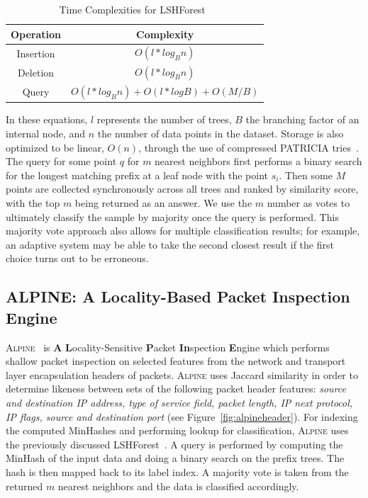 \begin{table} [ht!]
\caption{Time Complexities for LSHForest~\cite{lshforest}}
\centering
\begin{tabular}{|c | c |}
\hline
\textbf{Operation} & \textbf{Complexity} \\
\hline
Insertion & $O(l * log_B n)$ \\
\hline
Deletion & $O(l * log_B n)$ \\
\hline
Query &  $O(l * log_B n) + O(l * log B) + O(M/B)$\\
\hline
\end{tabular}
\label{table:forestcomplex}
\end{table}

In these equations, $l$ represents the number of trees, $B$ the branching factor of an internal node, and $n$ the number of data points in the dataset. Storage is also optimized to be linear, $O(n)$, through the use of compressed PATRICIA tries~\cite{lshforest}. The query for some point $q$ for $m$ nearest neighbors first performs a binary search for the longest matching prefix at a leaf node with the point $s_i$. Then some $M$ points are collected synchronously across all trees and ranked by similarity score, with the top $m$ being returned as an answer. We use the $m$ number as votes to ultimately classify the sample by majority once the query is performed. This majority vote approach also allows for multiple classification results; for example, an adaptive system may be able to take the second closest result if the first choice turns out to be erroneous.

\subsection{ALPINE: A Locality-Based Packet Inspection Engine}
\textsc{Alpine}~\cite{alpinepalm} is \textbf{A} \textbf{L}ocality-Sensitive \textbf{P}acket \textbf{In}spection \textbf{E}ngine which performs shallow packet inspection on selected features from the network and transport layer encapsulation headers of packets. \textsc{Alpine} uses Jaccard similarity in order to determine likeness between sets of the following packet header features: \textit{source and destination IP address, type of service field, packet length, IP next protocol, IP flags, source and destination port} (see Figure~\ref{fig:alpineheader}). For indexing the computed MinHashes and performing lookup for classification, \textsc{Alpine} uses the previously discussed LSHForest~\cite{lshforest}. A query is performed by computing the MinHash of the input data and doing a binary search on the prefix trees. The hash is then mapped back to its label index. A majority vote is taken from the returned $m$ nearest neighbors and the data is classified accordingly.

